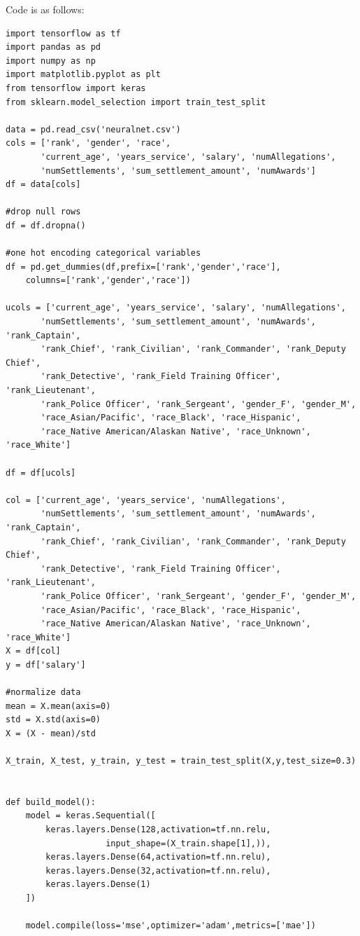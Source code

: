 \documentclass[11pt]{article}
\begin{document}
\noindent Code is as follows:
\begin{lstlisting}
import tensorflow as tf
import pandas as pd
import numpy as np
import matplotlib.pyplot as plt
from tensorflow import keras
from sklearn.model_selection import train_test_split

data = pd.read_csv('neuralnet.csv')
cols = ['rank', 'gender', 'race',
       'current_age', 'years_service', 'salary', 'numAllegations',
       'numSettlements', 'sum_settlement_amount', 'numAwards']
df = data[cols]

#drop null rows
df = df.dropna()

#one hot encoding categorical variables
df = pd.get_dummies(df,prefix=['rank','gender','race'],
	columns=['rank','gender','race'])

ucols = ['current_age', 'years_service', 'salary', 'numAllegations',
       'numSettlements', 'sum_settlement_amount', 'numAwards', 'rank_Captain',
       'rank_Chief', 'rank_Civilian', 'rank_Commander', 'rank_Deputy Chief',
       'rank_Detective', 'rank_Field Training Officer', 'rank_Lieutenant',
       'rank_Police Officer', 'rank_Sergeant', 'gender_F', 'gender_M',
       'race_Asian/Pacific', 'race_Black', 'race_Hispanic',
       'race_Native American/Alaskan Native', 'race_Unknown', 'race_White']

df = df[ucols]

col = ['current_age', 'years_service', 'numAllegations',
       'numSettlements', 'sum_settlement_amount', 'numAwards', 'rank_Captain',
       'rank_Chief', 'rank_Civilian', 'rank_Commander', 'rank_Deputy Chief',
       'rank_Detective', 'rank_Field Training Officer', 'rank_Lieutenant',
       'rank_Police Officer', 'rank_Sergeant', 'gender_F', 'gender_M',
       'race_Asian/Pacific', 'race_Black', 'race_Hispanic',
       'race_Native American/Alaskan Native', 'race_Unknown', 'race_White']
X = df[col]
y = df['salary']

#normalize data
mean = X.mean(axis=0)
std = X.std(axis=0)
X = (X - mean)/std

X_train, X_test, y_train, y_test = train_test_split(X,y,test_size=0.3)


def build_model():
    model = keras.Sequential([
        keras.layers.Dense(128,activation=tf.nn.relu,
        			input_shape=(X_train.shape[1],)),
        keras.layers.Dense(64,activation=tf.nn.relu),
        keras.layers.Dense(32,activation=tf.nn.relu),
        keras.layers.Dense(1)
    ])
    
    model.compile(loss='mse',optimizer='adam',metrics=['mae'])
    

\end{lstlisting}
\end{document}
